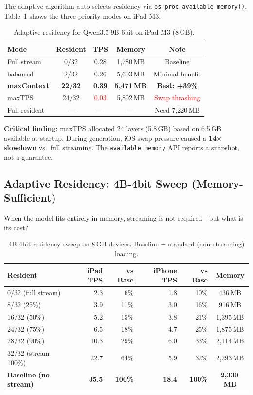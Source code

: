 \documentclass[10pt,a4paper]{article}
\begin{document}
The adaptive algorithm auto-selects residency via \texttt{os\_proc\_available\_memory()}. Table~\ref{tab:adaptive9b} shows the three priority modes on iPad M3.

\begin{table}[ht!]
\centering\small
\caption{Adaptive residency for Qwen3.5-9B-6bit on iPad M3 (8\,GB).}
\label{tab:adaptive9b}
\begin{tabular}{lcccc}
\toprule
\textbf{Mode} & \textbf{Resident} & \textbf{TPS} & \textbf{Memory} & \textbf{Note} \\
\midrule
Full stream & 0/32 & 0.28 & 1,780\,MB & Baseline \\
balanced & 2/32 & 0.26 & 5,603\,MB & Minimal benefit \\
\textbf{maxContext} & \textbf{22/32} & \textbf{0.39} & \textbf{5,471\,MB} & \textbf{Best: +39\%} \\
maxTPS & 24/32 & \textcolor{red}{0.03} & 5,802\,MB & \textcolor{red}{Swap thrashing} \\
Full resident & --- & --- & --- & Need 7,220\,MB \\
\bottomrule
\end{tabular}
\end{table}

\textbf{Critical finding}: maxTPS allocated 24 layers (5.8\,GB) based on 6.5\,GB available at startup. During generation, iOS swap pressure caused a \textbf{14$\times$ slowdown} vs.\ full streaming. The \texttt{available\_memory} API reports a snapshot, not a guarantee.

\subsection{Adaptive Residency: 4B-4bit Sweep (Memory-Sufficient)}

When the model fits entirely in memory, streaming is not required---but what is its cost?

\begin{table}[ht!]
\centering\small
\caption{4B-4bit residency sweep on 8\,GB devices. Baseline = standard (non-streaming) loading.}
\label{tab:adaptive4b}
\begin{tabular}{lrrrrc}
\toprule
\textbf{Resident} & \textbf{iPad TPS} & \textbf{vs Base} & \textbf{iPhone TPS} & \textbf{vs Base} & \textbf{Memory} \\
\midrule
0/32 (full stream) & 2.3 & 6\% & 1.8 & 10\% & 436\,MB \\
8/32 (25\%) & 3.9 & 11\% & 3.0 & 16\% & 916\,MB \\
16/32 (50\%) & 5.2 & 15\% & 3.8 & 21\% & 1,395\,MB \\
24/32 (75\%) & 6.5 & 18\% & 4.7 & 25\% & 1,875\,MB \\
28/32 (90\%) & 10.3 & 29\% & 6.0 & 33\% & 2,114\,MB \\
32/32 (stream 100\%) & 22.7 & 64\% & 5.9 & 32\% & 2,293\,MB \\
\textbf{Baseline (no stream)} & \textbf{35.5} & \textbf{100\%} & \textbf{18.4} & \textbf{100\%} & \textbf{2,330\,MB} \\
\bottomrule
\end{tabular}
\end{table}
\end{document}
